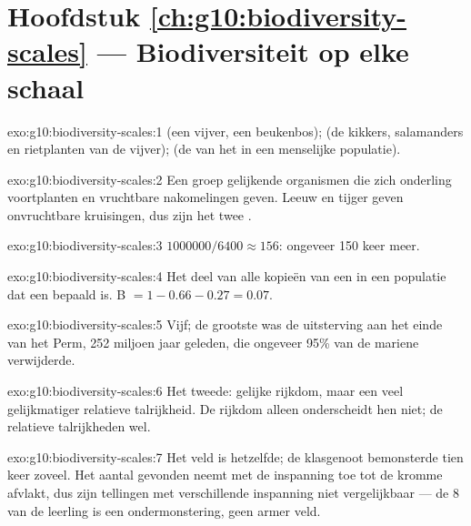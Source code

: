 \section*{Hoofdstuk \ref{ch:g10:biodiversity-scales} --- Biodiversiteit op elke schaal}

\begin{solution}{exo:g10:biodiversity-scales:1}
 (een vijver, een beukenbos);  (de kikkers, salamanders
en rietplanten van de vijver);  (de  van het  in een
menselijke populatie).
\end{solution}

\begin{solution}{exo:g10:biodiversity-scales:2}
Een groep gelijkende organismen die zich onderling voortplanten en
vruchtbare nakomelingen geven. Leeuw en tijger geven onvruchtbare
kruisingen, dus zijn het twee .
\end{solution}

\begin{solution}{exo:g10:biodiversity-scales:3}
$\num{1000000}/6400 \approx 156$: ongeveer 150 keer meer.
\end{solution}

\begin{solution}{exo:g10:biodiversity-scales:4}
Het deel van alle kopieën van een  in een populatie dat een bepaald
 is. B $= 1 - 0.66 - 0.27 = 0.07$.
\end{solution}

\begin{solution}{exo:g10:biodiversity-scales:5}
Vijf; de grootste was de uitsterving aan het einde van het Perm, 252
miljoen jaar geleden, die ongeveer 95\% van de mariene 
verwijderde.
\end{solution}

\begin{solution}{exo:g10:biodiversity-scales:6}
Het tweede: gelijke rijkdom, maar een veel gelijkmatiger relatieve
talrijkheid. De rijkdom alleen onderscheidt hen niet; de relatieve
talrijkheden wel.
\end{solution}

\begin{solution}{exo:g10:biodiversity-scales:7}
Het veld is hetzelfde; de klasgenoot bemonsterde tien keer zoveel. Het
aantal gevonden  neemt met de inspanning toe tot de kromme
afvlakt, dus zijn tellingen met verschillende inspanning niet
vergelijkbaar --- de 8 van de leerling is een ondermonstering, geen
armer veld.
\end{solution}

